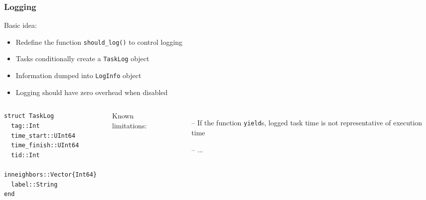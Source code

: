 \documentclass{beamer}
\begin{document}
\begin{frame}[fragile]
\frametitle{Logging}

Basic idea:
\begin{itemize}
  \item Redefine the function
  \texttt{should_log()} to control logging
  \item Tasks conditionally create a \texttt{TaskLog} object
  \item Information dumped into \texttt{LogInfo} object
  \item Logging should have zero overhead when disabled
\end{itemize}

\hrulefill

\begin{columns}


\begin{verbatim}
struct TaskLog
  tag::Int
  time_start::UInt64
  time_finish::UInt64
  tid::Int
  inneighbors::Vector{Int64}
  label::String
end
\end{verbatim}


Known limitations:
\begin{itemize}
  \item[--] If the function \texttt{yield}s, logged task time is
  not representative of execution time
  \item[--] ...
\end{itemize}

\end{columns}

\end{frame}



\end{document}
